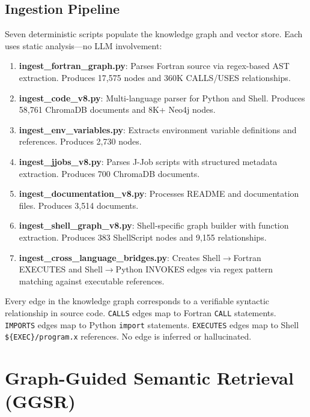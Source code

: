 \documentclass[11pt,letterpaper]{article}
\begin{document}
\subsection{Ingestion Pipeline}

Seven deterministic scripts populate the knowledge graph and vector store.
Each uses static analysis---no LLM involvement:

\begin{enumerate}[nosep]
    \item \textbf{ingest\_fortran\_graph.py}: Parses Fortran source via
          regex-based AST extraction. Produces 17,575 nodes and 360K
          CALLS/USES relationships.
    \item \textbf{ingest\_code\_v8.py}: Multi-language parser for Python
          and Shell. Produces 58,761 ChromaDB documents and 8K+ Neo4j nodes.
    \item \textbf{ingest\_env\_variables.py}: Extracts environment variable
          definitions and references. Produces 2,730 nodes.
    \item \textbf{ingest\_jjobs\_v8.py}: Parses J-Job scripts with
          structured metadata extraction. Produces 700 ChromaDB documents.
    \item \textbf{ingest\_documentation\_v8.py}: Processes README and
          documentation files. Produces 3,514 documents.
    \item \textbf{ingest\_shell\_graph\_v8.py}: Shell-specific graph
          builder with function extraction. Produces 383 ShellScript
          nodes and 9,155 relationships.
    \item \textbf{ingest\_cross\_language\_bridges.py}: Creates
          Shell$\to$Fortran EXECUTES and Shell$\to$Python INVOKES edges
          via regex pattern matching against executable references.
\end{enumerate}

\begin{definition}
Every edge in the knowledge graph corresponds to a verifiable syntactic
relationship in source code. \texttt{CALLS} edges map to Fortran
\texttt{CALL} statements. \texttt{IMPORTS} edges map to Python
\texttt{import} statements. \texttt{EXECUTES} edges map to Shell
\texttt{\$\{EXEC\}/program.x} references. No edge is inferred or
hallucinated.
\end{definition}

\section{Graph-Guided Semantic Retrieval (GGSR)}
\label{sec:ggsr}
\end{document}
